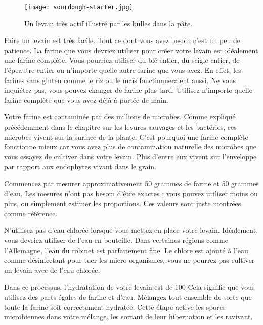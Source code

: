 \begin{figure}[!htb]
  \texttt{[image: sourdough-starter.jpg]}
  \caption[Levain très actif]{Un levain très actif illustré par les
      bulles dans la pâte.}%
  \label{fig:sourdough-starter}
\end{figure}Faire un levain est très facile. Tout ce dont vous avez besoin
c'est un peu de patience. La farine que vous devriez
utiliser pour créer votre levain est idéalement une farine complète.
Vous pourriez utiliser du blé entier, du seigle entier, de l'épeautre entier ou
n'importe quelle autre farine que vous avez. En effet, les farines sans gluten comme
le riz ou le maïs fonctionneraient aussi. Ne vous inquiétez pas, vous pouvez
changer de farine plus tard. Utilisez n'importe quelle farine complète que vous
avez déjà à portée de main.

Votre farine est contaminée par des millions de microbes. Comme expliqué
précédemment dans le chapitre sur les levures sauvages et les bactéries, ces
microbes vivent sur la surface de la plante. C'est pourquoi
une farine complète fonctionne mieux car vous avez plus de contamination naturelle
des microbes que vous essayez de cultiver
dans votre levain. Plus d'entre eux vivent sur l'enveloppe par rapport aux
endophytes vivant dans le grain.

Commencez par mesurer approximativement 50 grammes de farine et
50 grammes d'eau. Les mesures n'ont pas besoin d'être exactes ; vous pouvez utiliser
moins ou plus, ou simplement estimer les proportions. Ces
valeurs sont juste montrées comme référence.

N'utilisez pas d'eau chlorée lorsque vous mettez en place votre levain.
Idéalement, vous devriez utiliser de l'eau en bouteille. Dans certaines régions
comme l'Allemagne, l'eau du robinet est parfaitement fine. Le chlore est ajouté
à l'eau comme désinfectant pour tuer les micro-organismes, vous ne pourrez
pas cultiver un levain avec de l'eau chlorée.

Dans ce processus, l'hydratation de votre levain est de 100%
Cela signifie que vous utilisez des parts égales de farine et
d'eau. Mélangez tout ensemble de sorte que toute la farine soit
correctement hydratée. Cette étape active les spores microbiennes
dans votre mélange, les sortant de leur hibernation et
les ravivant.

